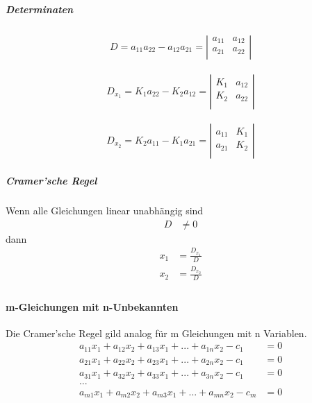 \subparagraph{Determinaten}
\begin{align*}
D= a_{11} a_{22} - a_{12} a_{21} = \left|
    \begin{array}{ccc}
       a_{11} & a_{12} \\
       a_{21} & a_{22} \\
    \end{array}
    \right|
\end{align*}

\begin{align*}
D_{{x}_1}= K_1 a_{22} - K_2 a_{12} = \left|
     \begin{array}{ccc}
        K_1 & a_{12} \\
        K_2 & a_{22} \\
     \end{array}
     \right|
\end{align*}

\begin{align*}
D_{{x}_2}= K_2 a_{11} - K_1 a_{21} = \left|
     \begin{array}{ccc}
        a_{11} & K_1 \\
        a_{21} & K_2 \\
     \end{array}
     \right|
\end{align*}

\subparagraph{Cramer'sche Regel}
Wenn alle Gleichungen linear unabhängig sind
\begin{align*}
D &\neq 0
\end{align*}
dann
\begin{align*}
x_1 &= \frac{ D_{{x}_1} }{D} \\
x_2 &= \frac{ D_{{x}_2} }{D} \\
\end{align*}



\paragraph{m-Gleichungen mit n-Unbekannten}
Die Cramer'sche Regel gild analog für m Gleichungen mit n Variablen.
\begin{align*}
a_{11}x_{1}+a_{12}x_{2}+a_{13}x_{1}+...+a_{1n}x_{2}-c_{1}&=0 \\
a_{21}x_{1}+a_{22}x_{2}+a_{23}x_{1}+...+a_{2n}x_{2}-c_{1}&=0 \\
a_{31}x_{1}+a_{32}x_{2}+a_{33}x_{1}+...+a_{3n}x_{2}-c_{1}&=0 \\
...\\
a_{m1}x_{1}+a_{m2}x_{2}+a_{m3}x_{1}+...+a_{mn}x_{2}-c_{m}&=0 \\
\end{align*}

